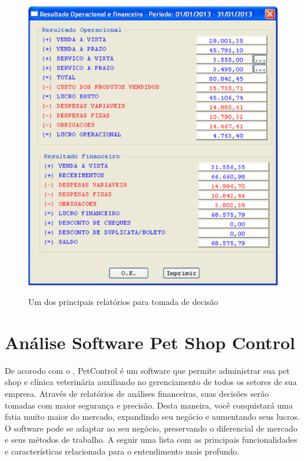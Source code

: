 \documentclass[12pt,openright,twoside,a4paper,english,french,spanish,brazil]{abntex2}
\begin{document}
\begin{figure}[htb!]
\includegraphics[scale=0.6]{relatorio_operacional_financeiro} 
\centering
\caption{Um dos principais relatórios para tomada de decisão}
\cite{NetServiceConsultoriaemSistemas2013}
\label{img_operacional_financeiro}
\end{figure}


\newpage
\section*{Análise Software Pet Shop Control}
De acorodo com o \cite{PetControl2013}, PetControl é um software que permite administrar sua pet shop e clínica veterinária auxiliando no gerenciamento de todos os setores de sua empresa. Através de relatórios de análises financeiras, suas decisões serão tomadas com maior segurança e precisão. Desta maneira, você conquistará uma fatia muito maior do mercado, expandindo seu negócio e aumentando seus lucros. O software pode se adaptar ao seu negócio, preservando o diferencial de mercado e seus métodos de trabalho.
A seguir uma lista com as principais funcionalidades e características relacionada para o entendimento mais profundo.
\end{document}
